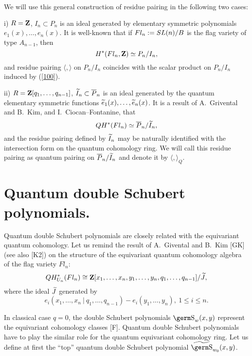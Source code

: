 {We will use this general construction of residue pairing in the following 
two cases:

i) $R={\bf Z}$, $I_n\subset P_n$ is an ideal generated by elementary 
symmetric polynomials $e_1(x), \ldots ,e_n(x)$. It is well-known that if 
$\hbox{$Fl_n$} :=SL(n)/B$ is the flag variety of type $A_{n-1}$, then
$$H^*(\hbox{$Fl_n$} ,{\bf Z})\simeq P_n/I_n,
$$
and residue pairing $\langle ,\rangle$ on $P_n/I_n$ coincides with the 
scalar product on $P_n/I_n$ induced by (\ref{100}).

ii) $R={\bf Z}[q_1,\ldots ,q_{n-1}]$, $\widetilde I_n\subset\overline P_n$ 
is an ideal 
generated by the quantum elementary symmetric functions $\widetilde 
e_1(x),\ldots ,\widetilde e_n(x)$. It is a result of A.~Grivental and B.~Kim, 
and I.~Ciocan--Fontanine, that
$$QH^*(\hbox{$Fl_n$} )\simeq\overline P_n/\widetilde I_n, 
$$
and the residue pairing defined by $\widetilde I_n$ may be naturally identified 
with the intersection form on the quantum cohomology ring. We will call 
this residue pairing as quantum pairing on $\overline P_n/\widetilde I_n$ and denote 
it by $\langle ,\rangle_Q$.

\section{Quantum double Schubert polynomials.}

Quantum double Schubert polynomials are closely related with the 
equivariant quantum cohomology. Let us remind the result of A.~Givental 
and B.~Kim [GK] (see also [K2]) on the structure of the equivariant 
quantum cohomology algebra of the flag variety $Fl_n$:
$$QH^*_{U_n}(Fl_n)\cong{\bf Z}[x_1,\ldots ,x_n,y_1,\ldots ,y_n,q_1,\ldots 
,q_{n-1}]/\widetilde J,
$$
where the ideal $\widetilde J$ generated by 
$$e_i(x_1,\ldots ,x_n~|~q_1,\ldots ,q_{n-1})-e_i(y_1,\ldots ,y_n), \ 1\le 
i\le n.
$$

In classical case $q=0$, the double Schubert polynomials $\s_w(x,y)$
represent the equivariant cohomology classes [F]. Quantum double Schubert
polynomials have to play the similar role for the quantum equivariant
cohomology ring. Let us define at first the ``top'' quantum double
Schubert polynomial $\wt{\s}_{w_0}(x,y)$.

}
